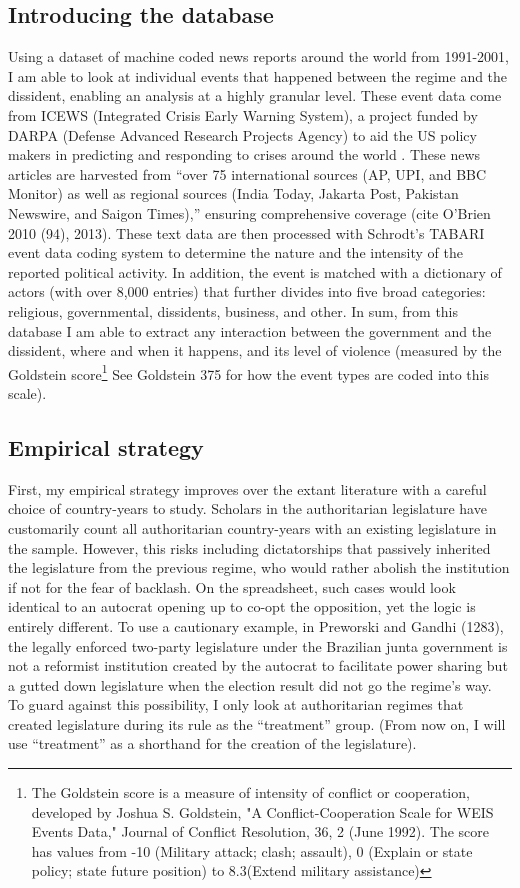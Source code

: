 \documentclass[12pt]{article}
\begin{document}
\subsection{Introducing the database}

Using a dataset of machine coded news reports around the world from 1991-2001, I am able to look at individual events that happened between the regime and the dissident, enabling an analysis at a highly granular level. These event data come from ICEWS (Integrated Crisis Early Warning System), a project funded by DARPA (Defense Advanced Research Projects Agency) to aid the US policy makers in predicting and responding to crises around the world . These news articles are harvested from “over 75 international sources (AP, UPI, and BBC Monitor) as well as regional sources (India Today, Jakarta Post, Pakistan Newswire, and Saigon Times),” ensuring comprehensive coverage  (cite O'Brien 2010 (94), 2013). These text data are then processed with Schrodt's TABARI event data coding system to determine the nature and the intensity of the reported political activity. In addition, the event is matched with a dictionary of actors (with over 8,000 entries) that further divides into five broad categories: religious, governmental, dissidents, business, and other. In sum, from this database I am able to extract any interaction between the government and the dissident, where and when it happens, and its level of violence (measured by the Goldstein score\footnote{The Goldstein score is a measure of intensity of conflict or cooperation, developed by Joshua S. Goldstein, "A Conflict-Cooperation Scale for WEIS Events Data," Journal of Conflict Resolution, 36, 2 (June 1992). The score has values from -10 (Military attack; clash; assault), 0 (Explain or state policy; state future position) to 8.3(Extend military assistance)} See Goldstein 375 for how the event types are coded into this scale).

\subsection{Empirical strategy}

First, my empirical strategy improves over the extant literature with a careful choice of country-years to study. Scholars in the authoritarian legislature have customarily count all authoritarian country-years with an existing legislature in the sample. However, this risks including dictatorships that passively inherited the legislature from the previous regime, who would rather abolish the institution if not for the fear of backlash. On the spreadsheet, such cases would look identical to an autocrat opening up to co-opt the opposition, yet the logic is entirely different. To use a cautionary example, in Preworski and Gandhi (1283), the legally enforced two-party legislature under the Brazilian junta government is not a reformist institution created by the autocrat to facilitate power sharing but a gutted down legislature when the election result did not go the regime's way. To guard against this possibility, I only look at authoritarian regimes that created  legislature during its rule as the ``treatment'' group. (From now on, I will use ``treatment'' as a shorthand for the creation of the legislature).
\end{document}
